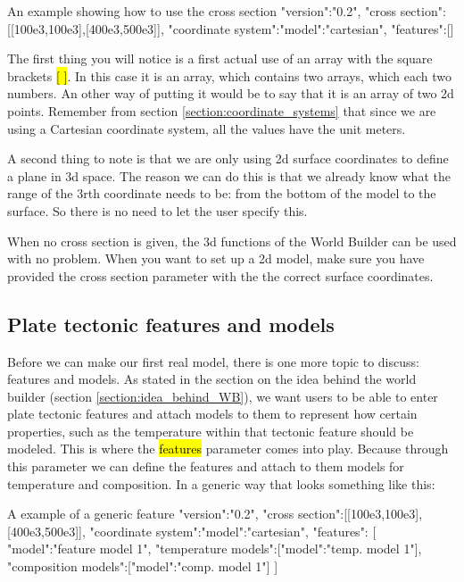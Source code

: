 \documentclass{book}
\newcommand{\WB}{{World Builder}}
\begin{document}
\begin{javascriptcode}{An example showing how to use the cross section}{}
{
  "version":"0.2",
  "cross section":[[100e3,100e3],[400e3,500e3]],
  "coordinate system":{"model":"cartesian"},
  "features":[]
}
\end{javascriptcode}

The first thing you will notice is a first actual use of an array with the square brackets \hl{[ ]}. In this case it is an array, which contains two arrays, which each two numbers. An other way of putting it would be to say that it is an array of two 2d points. Remember from section \ref{section:coordinate_systems} that since we are using a Cartesian coordinate system, all the values have the unit meters. 

A second thing to note is that we are only using 2d surface coordinates to define a plane in 3d space. The reason we can do this is that we already know what the range of the 3rth coordinate needs to be: from the bottom of the model to the surface. So there is no need to let the user specify this.

When no cross section is given, the 3d functions of the \WB{} can be used with no problem. When you want to set up a 2d model, make sure you have provided the cross section parameter with the the correct surface coordinates.

\subsection{Plate tectonic features and models}
Before we can make our first real model, there is one more topic to discuss: features and models. As stated in the section on the idea behind the world builder (section \ref{section:idea_behind_WB}), we want users to be able to enter plate tectonic features and attach models to them to represent how certain properties, such as the temperature within that tectonic feature should be modeled. This is where the \hl{features} parameter comes into play. Because through this parameter we can define the features and attach to them models for temperature and composition. In a generic way that looks something like this:

\begin{javascriptcode}{A example of a generic feature}{}
{
  "version":"0.2",
  "cross section":[[100e3,100e3],[400e3,500e3]],
  "coordinate system":{"model":"cartesian"},
  "features":
  [
    {
      "model":"feature model 1",
      "temperature models":[{"model":"temp. model 1"}],
      "composition models":[{"model":"comp. model 1"}]
    }
  ]
}
\end{javascriptcode}
\end{document}
